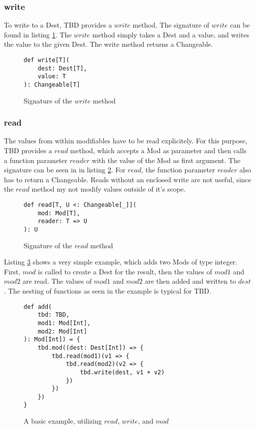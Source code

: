 \subsubsection{write}
To write to a Dest, TBD provides a $write$ method. The signature of $write$ can be found in listing \ref{code:write}. The $write$ method simply takes a Dest and a value, and writes the value to the given Dest. The write method returns a Changeable. 

\begin{figure}
\begin{lstlisting}[frame=single,basicstyle=\ttfamily]
def write[T](
    dest: Dest[T], 
    value: T
): Changeable[T]
\end{lstlisting}
\caption{Signature of the $write$ method}
\label{code:write}
\end{figure}

\subsubsection{read}
The values from within modifiables have to be read explicitely. For this purpose, TBD provides a $read$ method, which accepts a Mod as parameter and then calls a function parameter $reader$ with the value of the Mod as first argument. The signature can be seen in in listing \ref{code:read}. For $read$, the function parameter $reader$ also has to return a Changeable. Reads without an enclosed write are not useful, since the $read$ method my not modify values outside of it's scope.  

\begin{figure}
\begin{lstlisting}[frame=single,basicstyle=\ttfamily]
def read[T, U <: Changeable[_]](
    mod: Mod[T], 
    reader: T => U
): U
\end{lstlisting}
\caption{Signature of the $read$ method}
\label{code:read}
\end{figure}

Listing \ref{code:simpleExample} shows a very simple example, which adds two Mods of type integer. First, $mod$ is called to create a Dest for the result, then the values of $mod1$ and $mod2$ are read. The values of $mod1$ and $mod2$ are then added and written to $dest$. The nesting of functions as seen in the example is typical for TBD. 

\begin{figure}
\begin{lstlisting}[frame=single,basicstyle=\ttfamily]
def add(
    tbd: TBD, 
    mod1: Mod[Int], 
    mod2: Mod[Int]
): Mod[Int]) = {
    tbd.mod((dest: Dest[Int]) => {
        tbd.read(mod1)(v1 => {
            tbd.read(mod2)(v2 => {
                tbd.write(dest, v1 + v2)
            })
        })
    })
}
\end{lstlisting}
\caption{A basic example, utilizing $read$, $write$, and $mod$}
\label{code:simpleExample}
\end{figure}

